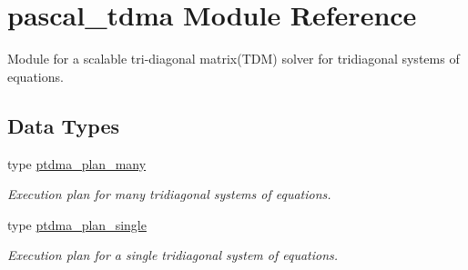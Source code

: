 \hypertarget{namespacepascal__tdma}{}\section{pascal\+\_\+tdma Module Reference}
\label{namespacepascal__tdma}


Module for a scalable tri-\/diagonal matrix(\+T\+D\+M) solver for tridiagonal systems of equations.  


\subsection*{Data Types}
\begin{DoxyCompactItemize}
\item 
type \mbox{\hyperlink{structpascal__tdma_1_1ptdma__plan__many}{ptdma\+\_\+plan\+\_\+many}}
\begin{DoxyCompactList}\small\item\em Execution plan for many tridiagonal systems of equations. \end{DoxyCompactList}\item 
type \mbox{\hyperlink{structpascal__tdma_1_1ptdma__plan__single}{ptdma\+\_\+plan\+\_\+single}}
\begin{DoxyCompactList}\small\item\em Execution plan for a single tridiagonal system of equations. \end{DoxyCompactList}\end{DoxyCompactItemize}
